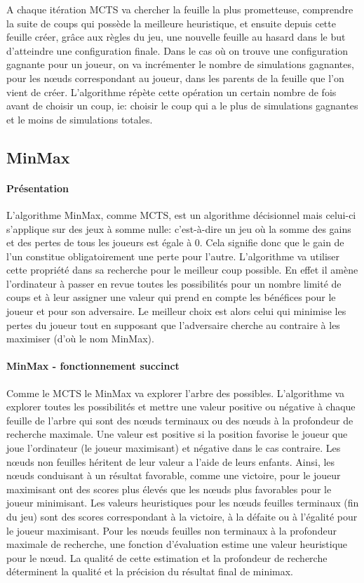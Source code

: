 A chaque itération MCTS va chercher la feuille la plus prometteuse, comprendre la suite de coups qui possède la meilleure heuristique, 
et ensuite depuis cette feuille créer, grâce aux règles du jeu, une nouvelle feuille au hasard dans le but d'atteindre une configuration finale.
Dans le cas où on trouve une configuration gagnante pour un joueur, on va incrémenter le nombre de simulations gagnantes, pour les nœuds
correspondant au joueur, dans les parents de la feuille que l'on vient de créer.
L'algorithme répète cette opération un certain nombre de fois avant de choisir un coup, ie: choisir le coup qui a le plus de simulations
gagnantes et le moins de simulations totales.



\subsection{MinMax}

\paragraph{Présentation}
L'algorithme MinMax, comme MCTS, est un algorithme décisionnel mais celui-ci s'applique sur des jeux à somme nulle: c'est-à-dire
un jeu où la somme des gains et des pertes de tous les joueurs est égale à 0. Cela signifie donc que le gain de l'un constitue 
obligatoirement une perte pour l'autre. L'algorithme va utiliser cette propriété dans sa recherche pour le meilleur coup possible.
En effet il amène l'ordinateur à passer en revue toutes les possibilités pour un nombre limité de coups et à leur assigner une valeur 
qui prend en compte les bénéfices pour le joueur et pour son adversaire. Le meilleur choix est alors celui qui minimise les pertes 
du joueur tout en supposant que l'adversaire cherche au contraire à les maximiser (d'où le nom MinMax).

\paragraph{MinMax - fonctionnement succinct}
Comme le MCTS le MinMax va explorer l'arbre des possibles. L'algorithme va explorer toutes les possibilités et mettre une valeur positive ou négative
à chaque feuille de l'arbre qui sont des nœuds terminaux ou des nœuds à la profondeur de recherche maximale.
Une valeur est positive si la position favorise le joueur que joue l'ordinateur (le joueur maximisant) et négative dans le cas contraire.
Les nœuds non feuilles héritent de leur valeur a l'aide de leurs enfants.
Ainsi, les nœuds conduisant à un résultat favorable, comme une victoire, pour le joueur maximisant ont des scores plus élevés que les nœuds 
plus favorables pour le joueur minimisant. Les valeurs heuristiques pour les nœuds feuilles terminaux (fin du jeu) sont des scores correspondant 
à la victoire, à la défaite ou à l'égalité pour le joueur maximisant. Pour les nœuds feuilles non terminaux à la profondeur maximale de recherche, 
une fonction d'évaluation estime une valeur heuristique pour le nœud. La qualité de cette estimation et la profondeur de recherche déterminent la 
qualité et la précision du résultat final de minimax.

